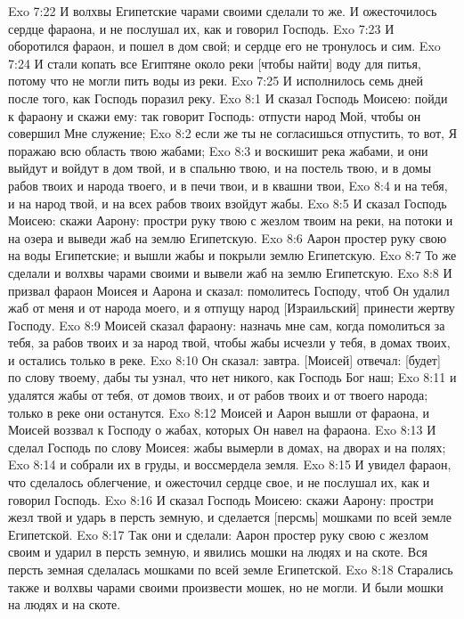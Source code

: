 Exo 7:22  И волхвы Египетские чарами своими сделали то же. И ожесточилось сердце фараона, и не послушал их, как и говорил Господь.
Exo 7:23  И оборотился фараон, и пошел в дом свой; и сердце его не тронулось и сим.
Exo 7:24  И стали копать все Египтяне около реки [чтобы найти] воду для питья, потому что не могли пить воды из реки.
Exo 7:25  И исполнилось семь дней после того, как Господь поразил реку.
Exo 8:1  И сказал Господь Моисею: пойди к фараону и скажи ему: так говорит Господь: отпусти народ Мой, чтобы он совершил Мне служение;
Exo 8:2  если же ты не согласишься отпустить, то вот, Я поражаю всю область твою жабами;
Exo 8:3  и воскишит река жабами, и они выйдут и войдут в дом твой, и в спальню твою, и на постель твою, и в домы рабов твоих и народа твоего, и в печи твои, и в квашни твои,
Exo 8:4  и на тебя, и на народ твой, и на всех рабов твоих взойдут жабы.
Exo 8:5  И сказал Господь Моисею: скажи Аарону: простри руку твою с жезлом твоим на реки, на потоки и на озера и выведи жаб на землю Египетскую.
Exo 8:6  Аарон простер руку свою на воды Египетские; и вышли жабы и покрыли землю Египетскую.
Exo 8:7  То же сделали и волхвы чарами своими и вывели жаб на землю Египетскую.
Exo 8:8  И призвал фараон Моисея и Аарона и сказал: помолитесь Господу, чтоб Он удалил жаб от меня и от народа моего, и я отпущу народ [Израильский] принести жертву Господу.
Exo 8:9  Моисей сказал фараону: назначь мне сам, когда помолиться за тебя, за рабов твоих и за народ твой, чтобы жабы исчезли у тебя, в домах твоих, и остались только в реке.
Exo 8:10  Он сказал: завтра. [Моисей] отвечал: [будет] по слову твоему, дабы ты узнал, что нет никого, как Господь Бог наш;
Exo 8:11  и удалятся жабы от тебя, от домов твоих, и от рабов твоих и от твоего народа; только в реке они останутся.
Exo 8:12  Моисей и Аарон вышли от фараона, и Моисей воззвал к Господу о жабах, которых Он навел на фараона.
Exo 8:13  И сделал Господь по слову Моисея: жабы вымерли в домах, на дворах и на полях;
Exo 8:14  и собрали их в груды, и воссмердела земля.
Exo 8:15  И увидел фараон, что сделалось облегчение, и ожесточил сердце свое, и не послушал их, как и говорил Господь.
Exo 8:16  И сказал Господь Моисею: скажи Аарону: простри жезл твой и ударь в персть земную, и сделается [персмь] мошками по всей земле Египетской.
Exo 8:17  Так они и сделали: Аарон простер руку свою с жезлом своим и ударил в персть земную, и явились мошки на людях и на скоте. Вся персть земная сделалась мошками по всей земле Египетской.
Exo 8:18  Старались также и волхвы чарами своими произвести мошек, но не могли. И были мошки на людях и на скоте.
